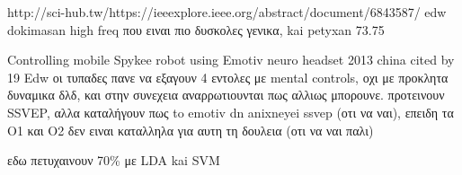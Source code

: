 \documentclass[11pt,a4paper,english,greek,twoside]{../Thesis}
\begin{document}
http://sci-hub.tw/https://ieeexplore.ieee.org/abstract/document/6843587/
edw dokimasan high freq που ειναι πιο δυσκολες γενικα, kai petyxan 73.75%

Controlling mobile Spykee robot using Emotiv neuro headset 2013 china
cited by 19
Edw οι τυπαδες πανε να εξαγουν 4 εντολες με mental controls, οχι με προκλητα δυναμικα δλδ, και στην συνεχεια αναρρωτιουνται πως αλλιως μπορουνε. προτεινουν SSVEP, αλλα καταλήγουν πως to emotiv dn anixneyei ssvep (οτι να ναι), επειδη τα Ο1 και Ο2 δεν ειναι καταλληλα για αυτη τη δουλεια (οτι να ναι παλι)

εδω πετυχαινουν 70\% με LDA kai SVM
\end{document}
